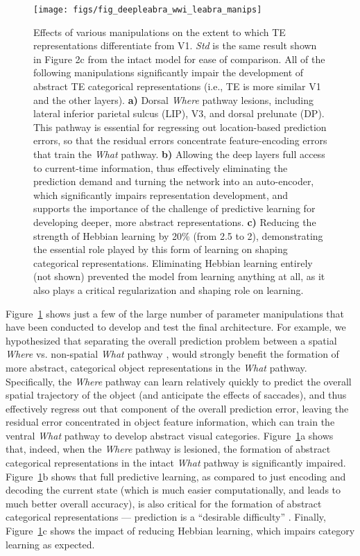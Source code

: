 \documentclass[11pt,twoside]{article}
\newif\myifpdf
\begin{document}
\begin{figure}
  \centering\texttt{[image: figs/fig\_deepleabra\_wwi\_leabra\_manips]}
  \caption{Effects of various manipulations on the extent to which TE representations differentiate from V1.  \emph{Std} is the same result shown in Figure 2c from the intact model for ease of comparison.  All of the following  manipulations significantly impair the development of abstract TE categorical representations (i.e., TE is more similar V1 and the other layers).  {\bf a)} Dorsal \emph{Where} pathway lesions, including lateral inferior parietal sulcus (LIP), V3, and dorsal prelunate (DP).  This pathway is essential for regressing out location-based prediction errors, so that the residual errors concentrate feature-encoding errors that train the \emph{What} pathway.  {\bf b)} Allowing the deep layers full access to current-time information, thus effectively eliminating the prediction demand and turning the network into an auto-encoder, which significantly impairs representation development, and supports the importance of the challenge of predictive learning for developing deeper, more abstract representations.  {\bf c)} Reducing the strength of Hebbian learning by 20\% (from 2.5 to 2), demonstrating the essential role played by this form of learning on shaping categorical representations.  Eliminating Hebbian learning entirely (not shown) prevented the model from learning anything at all, as it also plays a critical regularization and shaping role on learning.}
  \label{fig.manips}
\end{figure}

Figure~\ref{fig.manips} shows just a few of the large number of parameter manipulations that have been conducted to develop and test the final architecture.  For example, we hypothesized that separating the overall prediction problem between a spatial \emph{Where} vs. non-spatial \emph{What} pathway \cite{UngerleiderMishkin82,GoodaleMilner92}, would strongly benefit the formation of more abstract, categorical object representations in the \emph{What} pathway.  Specifically, the \emph{Where} pathway can learn relatively quickly to predict the overall spatial trajectory of the object (and anticipate the effects of saccades), and thus effectively regress out that component of the overall prediction error, leaving the residual error concentrated in object feature information, which can train the ventral \emph{What} pathway to develop abstract visual categories.  Figure~\ref{fig.manips}a shows that, indeed, when the \emph{Where} pathway is lesioned, the formation of abstract categorical representations in the intact \emph{What} pathway is significantly impaired.  Figure~\ref{fig.manips}b shows that full predictive learning, as compared to just encoding and decoding the current state (which is much easier computationally, and leads to much better overall accuracy), is also critical for the formation of abstract categorical representations --- prediction is a ``desirable difficulty'' \cite{Bjork94}.  Finally, Figure~\ref{fig.manips}c shows the impact of reducing Hebbian learning, which impairs category learning as expected.
\end{document}
